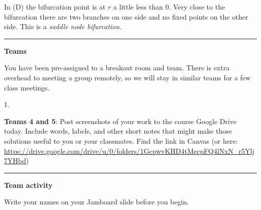 \documentclass[12pt,letterpaper,noanswers]{exam}
\begin{document}
In (D) the bifurcation point is at $r$ a little less than $0$.  Very close to the bifurcation there are two branches on one side and no fixed points on the other side.  This is a \emph{saddle node bifurcation}.

\vspace{0.2cm}

\hrule
\vspace{0.2cm}








\noindent\textbf{Teams}

You have been pre-assigned to a breakout room and team.  There is extra overhead to meeting a group remotely, so we will stay in similar teams for a few class meetings.

\begin{multicols}{2}
1. 
\end{multicols}

\noindent \textbf{Teams 4 and 5}: Post screenshots of your work to the course Google Drive today.  Include words, labels, and other short notes that might make those solutions useful to you or your classmates.  Find the link in Canvas (or here: \url{https://drive.google.com/drive/u/0/folders/1GcpwvKHD4tMecpFQ4lNxN_r5Ylj7YHbd})
\vspace{0.2cm}

\hrule
\vspace{0.2cm}

\noindent\textbf{Team activity}

Write your names on your Jamboard slide before you begin.
\end{document}
